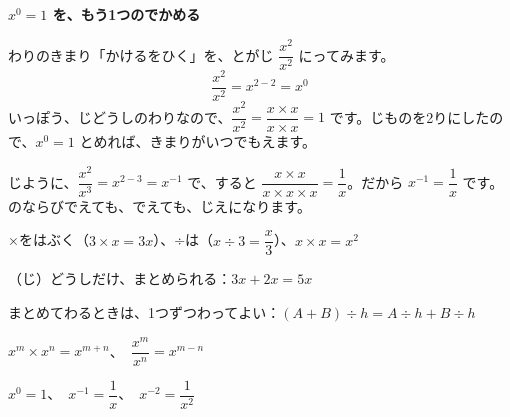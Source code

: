 \begin{motto}[2]
\textbf{$x^0=1$ を、もう1つのでかめる}\par
わりのきまり「かけるをひく」を、とがじ $\dfrac{x^2}{x^2}$ にってみます。
\[ \frac{x^2}{x^2}=x^{2-2}=x^0 \]
いっぽう、じどうしのわりなので、$\dfrac{x^2}{x^2}=\dfrac{x\times x}{x\times x}=1$ です。じものを2りにしたので、$x^0=1$ とめれば、きまりがいつでもえます。\par
{}じように、$\dfrac{x^2}{x^3}=x^{2-3}=x^{-1}$ で、すると $\dfrac{x\times x}{x\times x\times x}=\dfrac{1}{x}$。だから $x^{-1}=\dfrac{1}{x}$ です。のならびでえても、でえても、じえになります。
\end{motto}


\begin{taisetsu}
×をはぶく（$3\times x=3x$）、÷は（$x\div3=\dfrac{x}{3}$）、$x\times x=x^2$\par\vspace{2pt}
（じ）どうしだけ、まとめられる：$3x+2x=5x$\par\vspace{2pt}
まとめてわるときは、1つずつわってよい：$(A+B)\div h=A\div h+B\div h$\par\vspace{2pt}
$x^m\times x^n=x^{m+n}$、\ $\dfrac{x^m}{x^n}=x^{m-n}$\par\vspace{2pt}
$x^0=1$、\ $x^{-1}=\dfrac{1}{x}$、\ $x^{-2}=\dfrac{1}{x^2}$
\end{taisetsu}

\begin{kotoba}
\small
{}
\end{kotoba}

{}

